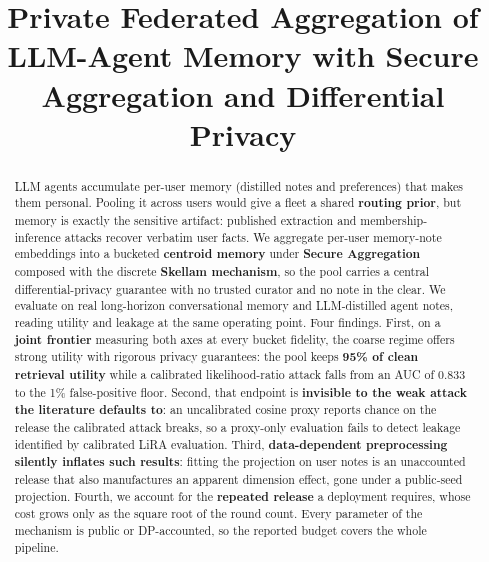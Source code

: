\documentclass[conference]{IEEEtran}
\theoremstyle{remark}
\begin{document}
\title{
Private Federated Aggregation of LLM-Agent Memory with Secure Aggregation and Differential Privacy}

\author{
}

\maketitle

\begin{abstract}
LLM agents accumulate per-user memory (distilled notes and preferences) that makes them personal. Pooling it across users would give a fleet a shared \textbf{routing prior}, but memory is exactly the sensitive artifact: published extraction and membership-inference attacks recover verbatim user facts. We aggregate per-user memory-note embeddings into a bucketed \textbf{centroid memory} under \textbf{Secure Aggregation} composed with the discrete \textbf{Skellam mechanism}, so the pool carries a central differential-privacy guarantee with no trusted curator and no note in the clear. We evaluate on real long-horizon conversational memory and LLM-distilled agent notes, reading utility and leakage at the same operating point. Four findings. First, on a \textbf{joint frontier} measuring both axes at every bucket fidelity, the coarse regime offers strong utility with rigorous privacy guarantees: the pool keeps \textbf{95\% of clean retrieval utility} while a calibrated likelihood-ratio attack falls from an AUC of 0.833 to the 1\% false-positive floor. Second, that endpoint is \textbf{invisible to the weak attack the literature defaults to}: an uncalibrated cosine proxy reports chance on the release the calibrated attack breaks, so a proxy-only evaluation fails to detect leakage identified by calibrated LiRA evaluation. Third, \textbf{data-dependent preprocessing silently inflates such results}: fitting the projection on user notes is an unaccounted release that also manufactures an apparent dimension effect, gone under a public-seed projection. Fourth, we account for the \textbf{repeated release} a deployment requires, whose cost grows only as the square root of the round count. Every parameter of the mechanism is public or DP-accounted, so the reported budget covers the whole pipeline.
\end{abstract}
\end{document}
